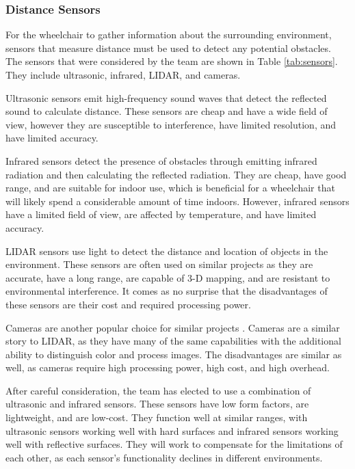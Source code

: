 \documentclass[conference]{IEEEtran}
\begin{document}
            \subsubsection{Distance Sensors}
            For the wheelchair to gather information about the surrounding environment, sensors that measure distance must be used to detect any potential obstacles. The sensors that were considered by the team are shown in Table \ref{tab:sensors}. They include ultrasonic, infrared, LIDAR, and cameras. 
            
            Ultrasonic sensors emit high-frequency sound waves that detect the reflected sound to calculate distance. These sensors are cheap and have a wide field of view, however they are susceptible to interference, have limited resolution, and have limited accuracy. 
    
            Infrared sensors detect the presence of obstacles through emitting infrared radiation and then calculating the reflected radiation. They are cheap, have good range, and are suitable for indoor use, which is beneficial for a wheelchair that will likely spend a considerable amount of time indoors. However, infrared sensors have a limited field of view, are affected by temperature, and have limited accuracy.
    
            LIDAR sensors use light to detect the distance and location of objects in the environment. These sensors are often used on similar projects \cite{learning_to_control, openbci-research, collab_controller} as they are accurate, have a long range, are capable of 3-D mapping, and are resistant to environmental interference. It comes as no surprise that the disadvantages of these sensors are their cost and required processing power.
    
            Cameras are another popular choice for similar projects \cite{learning_to_control, openbci-research}. Cameras are a similar story to LIDAR, as they have many of the same capabilities with the additional ability to distinguish color and process images. The disadvantages are similar as well, as cameras require high processing power, high cost, and high overhead. 
    
            After careful consideration, the team has elected to use a combination of ultrasonic and infrared sensors. These sensors have low form factors, are lightweight, and are low-cost. They function well at similar ranges, with ultrasonic sensors working well with hard surfaces and infrared sensors working well with reflective surfaces. They will work to compensate for the limitations of each other, as each sensor's functionality declines in different environments. 
\end{document}
